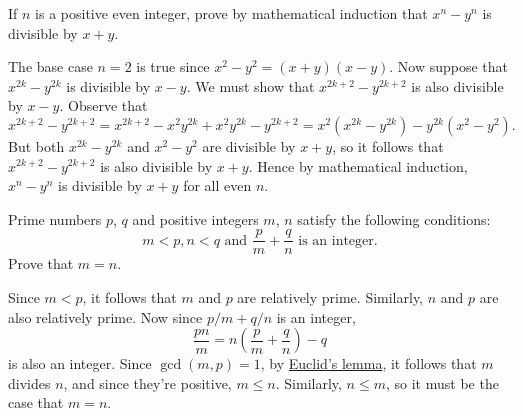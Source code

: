 \begin{question}
    If $n$ is a positive even integer, prove by mathematical induction that
    $x^n - y^n$ is divisible by $x + y$.
\end{question}
\begin{solution}
    The base case $n = 2$ is true since $x^2 - y^2 = (x + y)(x - y)$. Now
    suppose that $x^{2k} - y^{2k}$ is divisible by $x - y$. We must show that
    $x^{2k + 2} - y^{2k + 2}$ is also divisible by $x - y$. Observe that
    \[ x^{2k + 2} - y^{2k + 2} = x^{2k + 2} - x^2 y^{2k} + x^2 y^{2k} - y^{2k +
    2} = x^2(x^{2k} - y^{2k}) - y^{2k}(x^2 - y^2). \]
    But both $x^{2k} - y^{2k}$ and $x^2 - y^2$ are divisible by $x + y$, so it
    follows that $x^{2k + 2} - y^{2k + 2}$ is also divisible by $x + y$. Hence
    by mathematical induction, $x^n - y^n$ is divisible by $x + y$ for all even $n$.
\end{solution}

\begin{question}
    Prime numbers $p$, $q$ and positive integers $m$, $n$ satisfy the following
    conditions:
    \[m < p, n < q \text{  and  }\frac{p}{m}+\frac{q}{n} \text{  is an integer.}\]
    Prove that $m = n$.
\end{question}
\begin{solution} 
    Since $m < p$, it follows that $m$ and $p$ are relatively prime. Similarly,
    $n$ and $p$ are also relatively prime. Now since $p/m + q/n$ is an integer,
    \[ \frac{pn}{m} = n\left(\frac{p}{m} + \frac{q}{n}\right) - q \]
    is also an integer. Since $\gcd(m, p) = 1$, by \hyperref[lem:
    euclid]{Euclid's lemma}, it follows that $m$ divides $n$, and since they're
    positive, $m \leq n$. Similarly, $n \leq m$, so it must be the case that $m
    = n$.
\end{solution}

